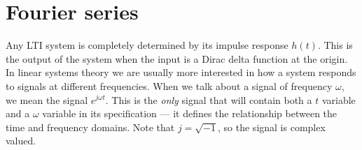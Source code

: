 \documentclass[10pt]{beamer}
\begin{document}
\pagestyle{fancy}
\fancyhead{}
\renewcommand{\headrulewidth}{0pt}
\fancyfoot[C]{\thesection-\thepage}

\begin{frame}
\titlepage
\end{frame}

\setcounter{section}{3}
\section{Fourier series}



Any LTI system is completely determined by its impulse response $h(t)$.  This is the output of the system when the input is a Dirac delta function at the origin.  In linear systems theory we are usually more interested in how a system responds to signals at different frequencies.  When we talk about a signal of frequency $\omega$, we mean the signal $e^{j \omega t}$.  This is the {\em only} signal that will contain both a $t$ variable and a $\omega$ variable in its specification --- it defines the relationship between the time and frequency domains.  Note that $j = \sqrt{-1}$, so the signal is complex valued.
\end{document}
